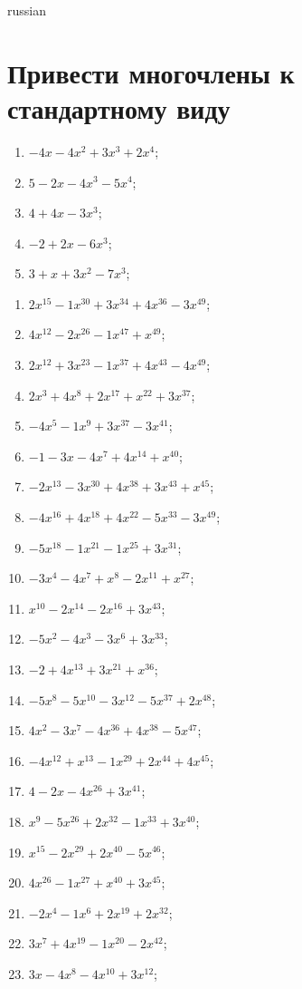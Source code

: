 \documentclass[a4paper]{article}
\begin{document}
\begin{otherlanguage*}{russian}

\section{Привести многочлены к стандартному виду}
\begin{enumerate}
\item $-4x-4x^2 + 3x^3 + 2x^4$;
\item $5-2x-4x^3-5x^4$;
\item $4 + 4x-3x^3$;
\item $-2 + 2x-6x^3$;
\item $3 + x + 3x^2-7x^3$;
\end{enumerate}
\begin{enumerate}
\item $2x^15-1x^30 + 3x^34 + 4x^36-3x^49$;
\item $4x^12-2x^26-1x^47 + x^49$;
\item $2x^12 + 3x^23-1x^37 + 4x^43-4x^49$;
\item $2x^3 + 4x^8 + 2x^17 + x^22 + 3x^37$;
\item $-4x^5-1x^9 + 3x^37-3x^41$;
\item $-1-3x-4x^7 + 4x^14 + x^40$;
\item $-2x^13-3x^30 + 4x^38 + 3x^43 + x^45$;
\item $-4x^16 + 4x^18 + 4x^22-5x^33-3x^49$;
\item $-5x^18-1x^21-1x^25 + 3x^31$;
\item $-3x^4-4x^7 + x^8-2x^11 + x^27$;
\item $x^10-2x^14-2x^16 + 3x^43$;
\item $-5x^2-4x^3-3x^6 + 3x^33$;
\item $-2 + 4x^13 + 3x^21 + x^36$;
\item $-5x^8-5x^10-3x^12-5x^37 + 2x^48$;
\item $4x^2-3x^7-4x^36 + 4x^38-5x^47$;
\item $-4x^12 + x^13-1x^29 + 2x^44 + 4x^45$;
\item $4-2x-4x^26 + 3x^41$;
\item $x^9-5x^26 + 2x^32-1x^33 + 3x^40$;
\item $x^15-2x^29 + 2x^40-5x^46$;
\item $4x^26-1x^27 + x^40 + 3x^45$;
\item $-2x^4-1x^6 + 2x^19 + 2x^32$;
\item $3x^7 + 4x^19-1x^20-2x^42$;
\item $3x-4x^8-4x^10 + 3x^12$;

\end{enumerate}
\end{otherlanguage*}
\end{document}
